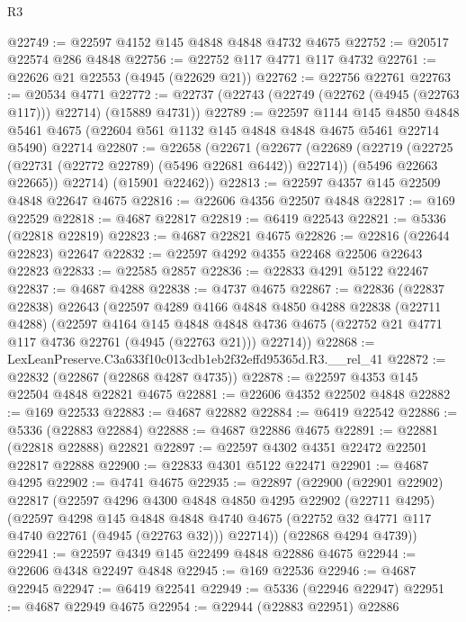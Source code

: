 \begin{lexlean}{R3}
\begin{coremodule}
@22749 := @22597 @4152 @145 @4848 @4848 @4732 @4675
@22752 := @20517 @22574 @286 @4848
@22756 := @22752 @117 @4771 @117 @4732
@22761 := @22626 @21 @22553 (@4945 (@22629 @21))
@22762 := @22756 @22761
@22763 := @20534 @4771
@22772 := @22737 (@22743 (@22749 (@22762 (@4945 (@22763 @117))) @22714) (@15889 @4731))
@22789 := @22597
    @1144
    @145
    @4850
    @4848
    @5461
    @4675
    (@22604 @561 @1132 @145 @4848 @4848 @4675 @5461 @22714 @5490)
    @22714
@22807 := @22658
    (@22671
      (@22677
        (@22689
          (@22719 (@22725 (@22731 (@22772 @22789) (@5496 @22681 @6442)) @22714))
          (@5496 @22663 @22665))
        @22714)
      (@15901 @22462))
@22813 := @22597 @4357 @145 @22509 @4848 @22647 @4675
@22816 := @22606 @4356 @22507 @4848
@22817 := @169 @22529
@22818 := @4687 @22817
@22819 := @6419 @22543
@22821 := @5336 (@22818 @22819)
@22823 := @4687 @22821 @4675
@22826 := @22816 (@22644 @22823) @22647
@22832 := @22597 @4292 @4355 @22468 @22506 @22643 @22823
@22833 := @22585 @2857
@22836 := @22833 @4291 @5122 @22467
@22837 := @4687 @4288
@22838 := @4737 @4675
@22867 := @22836
    (@22837 @22838)
    @22643
    (@22597
      @4289
      @4166
      @4848
      @4850
      @4288
      @22838
      (@22711 @4288)
      (@22597
        @4164
        @145
        @4848
        @4848
        @4736
        @4675
        (@22752 @21 @4771 @117 @4736 @22761 (@4945 (@22763 @21)))
        @22714))
@22868 := LexLeanPreserve.C3a633f10c013cdb1eb2f32effd95365d.R3.__rel_41
@22872 := @22832 (@22867 (@22868 @4287 @4735))
@22878 := @22597 @4353 @145 @22504 @4848 @22821 @4675
@22881 := @22606 @4352 @22502 @4848
@22882 := @169 @22533
@22883 := @4687 @22882
@22884 := @6419 @22542
@22886 := @5336 (@22883 @22884)
@22888 := @4687 @22886 @4675
@22891 := @22881 (@22818 @22888) @22821
@22897 := @22597 @4302 @4351 @22472 @22501 @22817 @22888
@22900 := @22833 @4301 @5122 @22471
@22901 := @4687 @4295
@22902 := @4741 @4675
@22935 := @22897
    (@22900
      (@22901 @22902)
      @22817
      (@22597
        @4296
        @4300
        @4848
        @4850
        @4295
        @22902
        (@22711 @4295)
        (@22597
          @4298
          @145
          @4848
          @4848
          @4740
          @4675
          (@22752 @32 @4771 @117 @4740 @22761 (@4945 (@22763 @32)))
          @22714))
      (@22868 @4294 @4739))
@22941 := @22597 @4349 @145 @22499 @4848 @22886 @4675
@22944 := @22606 @4348 @22497 @4848
@22945 := @169 @22536
@22946 := @4687 @22945
@22947 := @6419 @22541
@22949 := @5336 (@22946 @22947)
@22951 := @4687 @22949 @4675
@22954 := @22944 (@22883 @22951) @22886

\end{coremodule}
\end{lexlean}
